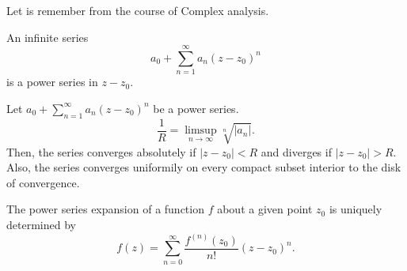 \begin{frame}
	Let is remember from the course of Complex analysis.

	\begin{definition}
		An infinite series
		\begin{equation*}
			a_{0}+
			\sum_{n=1}^{\infty}
			a_{n}
				{\left(z-z_{0}\right)}^{n}
		\end{equation*}
		is a \alert{power series} in $z-z_{0}$.
	\end{definition}

	\begin{theorem}
		Let
		\begin{math}
			a_{0}+
			\sum\limits_{n=1}^{\infty}
			a_{n}
				{\left(z-z_{0}\right)}^{n}
		\end{math}
		be a power series.
		\begin{equation*}
			\frac{1}{R}=
			\limsup_{n\to\infty}\sqrt[n]{\left|a_{n}\right|}.
		\end{equation*}
		Then, the series converges absolutely if
		\begin{math}
			\left|z-z_{0}\right|<R
		\end{math}
		and diverges if
		\begin{math}
			\left|z-z_{0}\right|>R
		\end{math}.
		Also, the series converges uniformily on every compact subset
		interior to the disk of convergence.
	\end{theorem}

	\begin{definition}
		The \alert{power series expansion} of a function $f$ about a
		given point $z_{0}$ is uniquely determined by
		\begin{equation*}
			f\left(z\right)=
			\sum_{n=0}^{\infty}
			\frac{f^{\left(n\right)}\left(z_{0}\right)}{n!}
			{\left(z-z_{0}\right)}^{n}.
		\end{equation*}
	\end{definition}
\end{frame}



